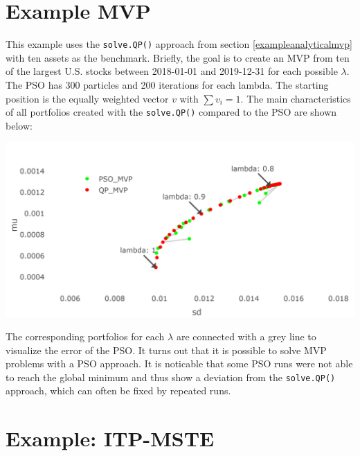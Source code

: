 \documentclass[
  oneside]{book}
\begin{document}
\hypertarget{example-mvp}{%
\section{Example MVP}\label{example-mvp}}

This example uses the \texttt{solve.QP()} approach from section \ref{exampleanalyticalmvp} with ten assets as the benchmark. Briefly, the goal is to create an MVP from ten of the largest U.S. stocks between 2018-01-01 and 2019-12-31 for each possible \(\lambda\). The PSO has 300 particles and 200 iterations for each lambda. The starting position is the equally weighted vector \(v\) with \(\textstyle\sum v_i=1\). The main characteristics of all portfolios created with the \texttt{solve.QP()} compared to the PSO are shown below:

\includegraphics{Master_Thesis_files/figure-latex/pso7-1.png}

The corresponding portfolios for each \(\lambda\) are connected with a grey line to visualize the error of the PSO. It turns out that it is possible to solve MVP problems with a PSO approach. It is noticable that some PSO runs were not able to reach the global minimum and thus show a deviation from the \texttt{solve.QP()} approach, which can often be fixed by repeated runs.

\hypertarget{example-itp-mste}{%
\section{Example: ITP-MSTE}\label{example-itp-mste}}
\end{document}
